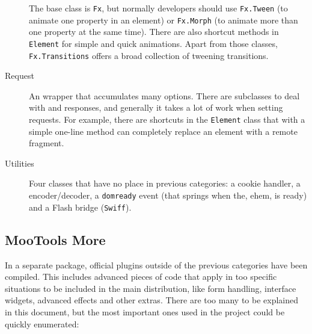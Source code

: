 \begin{description}
  The base class is \texttt{Fx}, but normally developers should use \texttt{Fx.Tween} (to animate one property in an element) or \texttt{Fx.Morph} (to animate more than one property at the same time).
  There are also shortcut methods in \texttt{Element} for simple and quick animations.
  Apart from those classes, \texttt{Fx.Transitions} offers a broad collection of tweening transitions.
  \item[Request] An  wrapper that accumulates many options.
  There are subclasses to deal with  and  responses, and generally it takes a lot of work when setting  requests.
  For example, there are shortcuts in the \texttt{Element} class that with a simple one-line method can completely replace an element with a remote fragment.
  \item[Utilities] Four classes that have no place in previous categories: a cookie handler, a  encoder/decoder, a \texttt{domready} event (that springs when the, ehem,  is ready) and a Flash bridge (\texttt{Swiff}).
\end{description}


\subsection{MooTools More} %
\label{sub:mootools_more}

In a separate package, official plugins outside of the previous categories have been compiled.
This includes advanced pieces of code that apply in too specific situations to be included in the main distribution, like form handling, interface widgets, advanced effects and other extras.
There are too many to be explained in this document, but the most important ones used in the project could be quickly enumerated:

